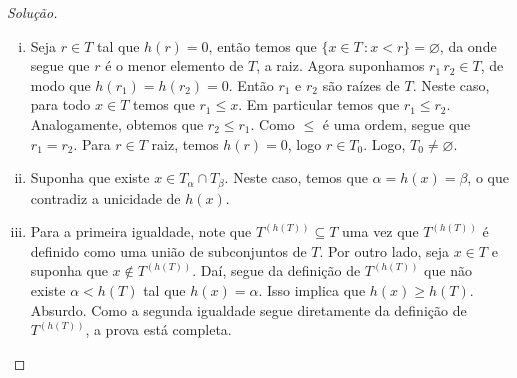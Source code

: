 \documentclass[a4paper]{article}
\theoremstyle{plain}\newtheorem{teo}{Teorema}[section]
\begin{document}
\begin{proof}[Solução]\hfill
  \begin{enumerate}[(i)]

  \item Seja \(r\in T\) tal que \(h(r)=0\), então temos que \(\{x\in T\,\colon
    x<r\}=\varnothing\), da onde segue que \(r\) é o menor elemento de \(T\), a raiz.
    Agora suponhamos \(r_1\, r_2\in T\), de modo que \(h(r_1)=h(r_2)=0\). Então \(r_1\) e
    \(r_2\) são raízes de \(T\). Neste caso,  para todo \(x\in T\) temos que
    \(r_1\leq x\). Em particular temos que \(r_1\leq r_2\).
    Analogamente, obtemos que \(r_2\leq r_1\). Como \(\leq\) é
    uma ordem, segue que \(r_1=r_2\). Para \(r\in T\) raiz, temos \(h(r)=0\), logo
    \(r\in T_0\). Logo, \(T_0\not=\varnothing\).
    

  \item Suponha que existe \(x\in T_\alpha\cap T_\beta\). Neste caso, temos que
    \(\alpha=h(x)=\beta\), o que contradiz a unicidade de \(h(x)\).

  \item Para a primeira igualdade, note que \(T^{(h(T))}\subseteq T\) uma vez
    que \(T^{(h(T))}\) é definido como uma união de subconjuntos de \(T\). Por
    outro lado, seja \(x\in T\) e suponha que \(x\not\in T^{(h(T))}\). Daí,
    segue da definição de \(T^{(h(T))}\) que não existe \(\alpha < h(T)\) tal
    que \(h(x)=\alpha\). Isso implica
    que \(h(x)\geq h(T)\). Absurdo. Como a segunda igualdade segue diretamente da
    definição de \(T^{(h(T))}\), a prova está completa. 


\end{enumerate}
\end{proof}
\end{document}
